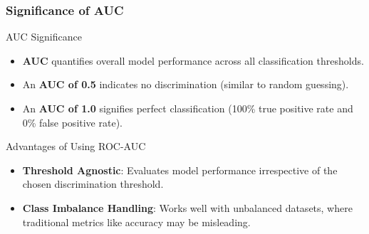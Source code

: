 \documentclass[aspectratio=169]{beamer}
\begin{document}
\begin{frame}[fragile]
  \frametitle{Significance of AUC}
  \begin{block}{AUC Significance}
    \begin{itemize}
      \item \textbf{AUC} quantifies overall model performance across all classification thresholds.
      \item An \textbf{AUC of 0.5} indicates no discrimination (similar to random guessing).
      \item An \textbf{AUC of 1.0} signifies perfect classification (100\% true positive rate and 0\% false positive rate).
    \end{itemize}
  \end{block}

  \begin{block}{Advantages of Using ROC-AUC}
    \begin{itemize}
      \item \textbf{Threshold Agnostic}: Evaluates model performance irrespective of the chosen discrimination threshold.
      \item \textbf{Class Imbalance Handling}: Works well with unbalanced datasets, where traditional metrics like accuracy may be misleading.
    \end{itemize}
  \end{block}
\end{frame}
\end{document}
